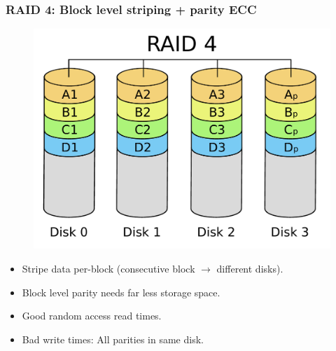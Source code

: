 \documentclass{beamer}
\begin{document}
\begin{frame}
    \frametitle{RAID 4: Block level striping + parity ECC}
    \begin{figure}
    \includegraphics[height=0.3\paperwidth]{RAID4.pdf}
    \end{figure}
    \begin{itemize}
        \item Stripe data per-block (consecutive block $\rightarrow$ different disks). \pause
        \item Block level parity needs far less storage space. \pause
        \item Good random access read times. \pause
        \item Bad write times: All parities in same disk.
    \end{itemize}
\end{frame}
\end{document}
